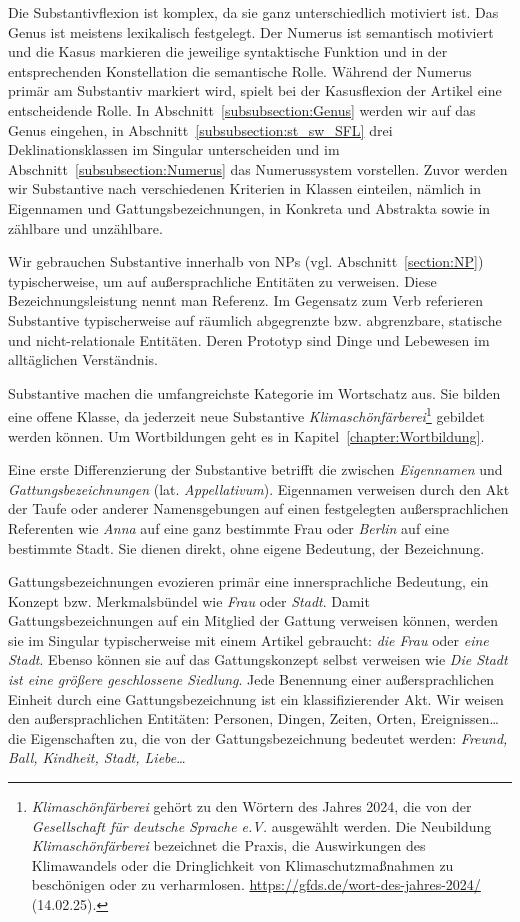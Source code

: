 Die Substantivflexion ist komplex, da sie ganz unterschiedlich motiviert ist. Das Genus ist meistens lexikalisch festgelegt. Der Numerus ist semantisch motiviert und die Kasus markieren die jeweilige syntaktische Funktion und in der entsprechenden Konstellation die semantische Rolle. Während der Numerus primär am Substantiv markiert wird, spielt bei der Kasusflexion der Artikel eine entscheidende Rolle. In Abschnitt~\ref{subsubsection:Genus} werden wir auf das Genus eingehen, in Abschnitt~\ref{subsubsection:st_sw_SFL} drei Deklinationsklassen im Singular unterscheiden und im Abschnitt~\ref{subsubsection:Numerus} das Numerussystem vorstellen. Zuvor werden wir Substantive nach verschiedenen Kriterien in Klassen einteilen, nämlich in Eigennamen und Gattungsbezeichnungen, in Konkreta und Abstrakta sowie in zählbare und unzählbare.

Wir gebrauchen Substantive innerhalb von NPs (vgl. Abschnitt~\ref{section:NP}) typischerweise, um auf außersprachliche Entitäten zu verweisen. Diese Bezeichnungsleistung nennt man Referenz. Im Gegensatz zum Verb referieren Substantive typischerweise auf räumlich abgegrenzte bzw. abgrenzbare, statische und nicht-relationale Entitäten. Deren Prototyp sind Dinge und Lebewesen im alltäglichen Verständnis. 

Substantive machen die umfangreichste Kategorie im Wortschatz aus. Sie bilden eine offene Klasse, da jederzeit neue Substantive \wzB \textit{Klimaschönfärberei}\footnote{\textit{Klimaschönfärberei} gehört zu den Wörtern des Jahres 2024, die von der \textit{Gesellschaft für deutsche Sprache e.V.} ausgewählt werden. Die Neubildung \textit{Klimaschönfärberei} bezeichnet die Praxis, die Auswirkungen des Klimawandels oder die Dringlichkeit von Klimaschutzmaßnahmen zu beschönigen oder zu verharmlosen. \url{https://gfds.de/wort-des-jahres-2024/} (14.02.25).} gebildet werden können. Um Wortbildungen geht es in Kapitel~\ref{chapter:Wortbildung}.

Eine erste Differenzierung der Substantive betrifft die zwischen \textit{Eigennamen} und \textit{Gattungsbezeichnungen} (lat. \textit{Appellativum}). Eigennamen verweisen durch den Akt der Taufe oder anderer Namensgebungen auf einen festgelegten außersprachlichen Referenten wie \textit{Anna} auf eine ganz bestimmte Frau oder \textit{Berlin} auf eine bestimmte Stadt. Sie dienen direkt, ohne eigene Bedeutung, der Bezeichnung.

Gattungsbezeichnungen evozieren primär eine innersprachliche Bedeutung, ein Konzept bzw. Merkmalsbündel wie \zB \textit{Frau} oder \textit{Stadt}. Damit Gattungsbezeichnungen auf ein Mitglied der Gattung verweisen können, werden sie im Singular typischerweise mit einem Artikel gebraucht: \textit{die Frau} oder \textit{eine Stadt}. Ebenso können sie auf das Gattungskonzept selbst verweisen wie \textit{Die Stadt ist eine größere geschlossene Siedlung}. Jede Benennung einer außersprachlichen Einheit durch eine Gattungsbezeichnung ist ein klassifizierender Akt. Wir weisen den außersprachlichen Entitäten: Personen, Dingen, Zeiten, Orten, Ereignissen\ldots{} die Eigenschaften zu, die von der Gattungsbezeichnung bedeutet werden: \textit{Freund, Ball, Kindheit, Stadt, Liebe}\ldots{} 

